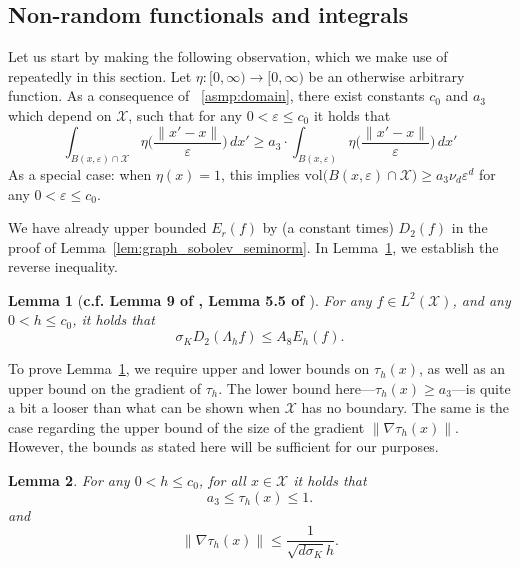 \documentclass[twoside]{article}
\newcommand{\vol}{\text{vol}}
\newcommand{\1}{\mathbf{1}}
\newcommand{\Xset}{\mathcal{X}}
\newcommand{\Leb}{L}
\newtheorem{lemma}{Lemma}
\theoremstyle{definition}
\theoremstyle{remark}
\begin{document}
\subsection{Non-random functionals and integrals}
\label{subsec:integrals}
Let us start by making the following observation, which we make use of repeatedly in this section. Let $\eta: [0,\infty) \to [0,\infty)$ be an otherwise arbitrary function. As a consequence of ~\ref{asmp:domain}, there exist constants $c_0$ and $a_3$ which depend on $\Xset$, such that for any $0 < \varepsilon \leq c_0$ it holds that 
\begin{equation}
\label{eqn:integral_boundary}
\int_{B(x,\varepsilon) \cap \Xset} \eta\biggl(\frac{\|x' - x\|}{\varepsilon}\biggr) \,dx' \geq a_3 \cdot \int_{B(x,\varepsilon)} \eta\biggl(\frac{\|x' - x\|}{\varepsilon}\biggr) \,dx'
\end{equation}
As a special case: when $\eta(x) = 1$, this implies $\vol\bigl(B(x,\varepsilon) \cap \Xset\bigr) \geq a_3 \nu_d \varepsilon^d$ for any $0 < \varepsilon \leq c_0$.

We have already upper bounded $E_r(f)$ by (a constant times) $D_2(f)$ in the proof of Lemma~\ref{lem:graph_sobolev_seminorm}. In Lemma~\ref{lem:first_order_graph_sobolev_seminorm_expected_lb}, we establish the reverse inequality.
\begin{lemma}[\textbf{c.f. Lemma 9 of \citet{trillos2019}, Lemma 5.5 of \citet{burago2014}}]
	\label{lem:first_order_graph_sobolev_seminorm_expected_lb}
	For any $f \in \Leb^2(\Xset)$, and any $0 < h \leq c_0$, it holds that
	\begin{equation*}
	\sigma_KD_2(\Lambda_hf) \leq A_8 E_h(f).
	\end{equation*}
\end{lemma}

To prove Lemma~\ref{lem:first_order_graph_sobolev_seminorm_expected_lb}, we require upper and lower bounds on $\tau_h(x)$, as well as an upper bound on the gradient of $\tau_h$. The lower bound here---$\tau_h(x) \geq a_3$---is quite a bit a looser than what can be shown when $\Xset$ has no boundary. The same is the case regarding the upper bound of the size of the gradient $\|\nabla \tau_h(x)\|$. However, the bounds as stated here will be sufficient for our purposes.
\begin{lemma}
	\label{lem:tau_bound}
	For any $0 < h \leq c_0$, for all $x \in \Xset$ it holds that
	\begin{equation*}
	a_3 \leq \tau_h(x) \leq 1.
	\end{equation*}
	and 
	\begin{equation*}
	\|\nabla \tau_h(x)\| \leq \frac{1}{\sqrt{d\sigma_K} h}.
	\end{equation*}
\end{lemma}
\end{document}
